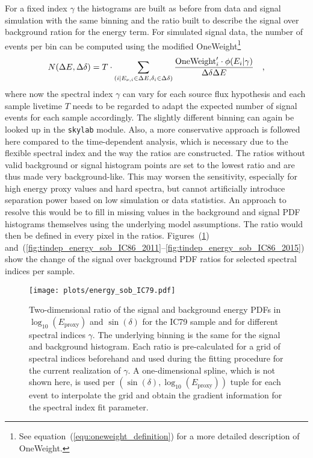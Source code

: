 For a fixed index $\gamma$ the histograms are built as before from data and signal simulation with the same binning and the ratio built to describe the signal over background ration for the energy term.
For simulated signal data, the number of events per bin can be computed using the modified OneWeight\footnote{See equation~(\ref{equ:oneweight_definition}) for a more detailed description of OneWeight.}
\begin{equation}
  N(\Delta E, \Delta\delta)
  = T\cdot \sum_{(i|E_{\nu,i}\in\Delta E, \delta_i\in\Delta\delta)}
    \frac{\text{OneWeight}'_i \cdot \phi(E_i|\gamma)}{\Delta\delta \Delta E}
  \quad\text{,}
\end{equation}
where now the spectral index $\gamma$ can vary for each source flux hypothesis and each sample livetime $T$ needs to be regarded to adapt the expected number of signal events for each sample accordingly.
The slightly different binning can again be looked up in the \lstinline!skylab! module.
Also, a more conservative approach is followed here compared to the time-dependent analysis, which is necessary due to the flexible spectral index and the way the ratios are constructed.
The ratios without valid background or signal histogram points are set to the lowest ratio and are thus made very background-like.
This may worsen the sensitivity, especially for high energy proxy values and hard spectra, but cannot artificially introduce separation power based on low simulation or data statistics.
An approach to resolve this would be to fill in missing values in the background and signal PDF histograms themselves using the underlying model assumptions.
The ratio would then be defined in every pixel in the ratios.
Figures~(\ref{fig:tindep_energy_sob_IC79}) and~(\ref{fig:tindep_energy_sob_IC86_2011}--\ref{fig:tindep_energy_sob_IC86_2015}) show the change of the signal over background PDF ratios for selected spectral indices per sample.

\begin{figure}[htpb]
  \centering
  \texttt{[image: plots/energy\_sob\_IC79.pdf]}
  \caption[Energy PDF for the time-integrated analysis for IC79]{
    Two-dimensional ratio of the signal and background energy PDFs in $\log_{10}\left(E_\text{proxy}\right)$ and $\sin(\delta)$ for the IC79 sample and for different spectral indices $\gamma$.
    The underlying binning is the same for the signal and background histogram.
    Each ratio is pre-calculated for a grid of spectral indices beforehand and used during the fitting procedure for the current realization of $\gamma$.
    A one-dimensional spline, which is not shown here, is used per $\left(\sin(\delta), \log_{10}\left(E_\text{proxy}\right)\right)$ tuple for each event to interpolate the grid and obtain the gradient information for the spectral index fit parameter.
  }
  \label{fig:tindep_energy_sob_IC79}
\end{figure}

